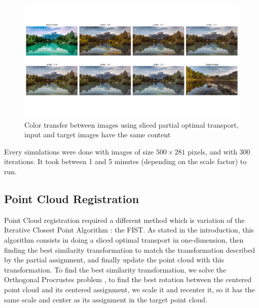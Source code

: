 \documentclass[a4paper,12pt]{article}
\begin{document}
\begin{figure}[H]
\includegraphics[trim=0cm 3cm 0cm 1.5cm, width = \columnwidth]{landscape12.pdf}
\caption{Color transfer between images using sliced partial optimal transport, input and target images have the same content}\label{12_fig}
\end{figure}

Every simulations were done with images of size $500 \times 281$ pixels, and with 300 iterations. It took between 1 and 5 minutes (depending on the scale factor) to run.

\subsection{Point Cloud Registration}

Point Cloud registration required a different method which is variation of the Iterative Closest Point Algorithm : the FIST. As stated in the introduction, this algorithm consists in doing a sliced optimal transport in one-dimension, then finding the best similarity transformation to match the transformation described by the partial assignment, and finally update the point cloud with this transformation. To find the best similarity transformation, we solve the Orthogonal Procrustes problem \cite{schonemann1966generalized}, to find the best rotation between the centered point cloud and its centered assignment, we scale it and recenter it, so it has the same scale and center as its assignment in the target point cloud.
\end{document}
